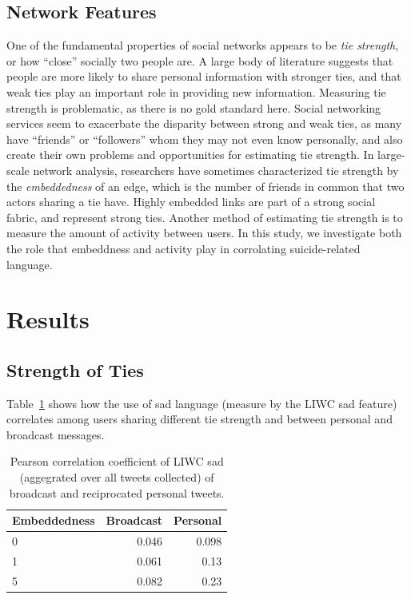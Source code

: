 \documentclass[11pt]{article}
\begin{document}
\subsection{Network Features}
One of the fundamental properties of social networks appears to be \emph{tie strength}, or how ``close'' socially two people are. A large body of literature suggests that people are more likely to share personal information with stronger ties, and that weak ties play an important role in providing new information.  
Measuring tie strength is problematic, as there is no gold standard here. Social networking services seem to exacerbate the disparity between strong and weak ties, as many have ``friends'' or ``followers'' whom they may not even know personally, and also create their own problems and opportunities for estimating tie strength. In large-scale network analysis, researchers have sometimes characterized tie strength by the 
\emph{embeddedness} of an edge, which is the number of friends in common that two actors sharing a tie have. Highly embedded links are part of a strong social fabric, and represent strong ties. Another method of estimating tie strength is to measure the amount of activity between users. In this study, we investigate both the role that embeddness and activity play in corrolating suicide-related language. 

\section{Results}
\subsection{Strength of Ties}
Table~\ref{tab:strength} shows how the use of sad language (measure by the LIWC sad feature) correlates among users sharing different tie strength and between personal and broadcast messages.

\begin{table}
  \centering
  \begin{tabular}{l|r|r}
Embeddedness    &Broadcast&Personal\\
\hline
0 & 0.046 & 0.098\\
\hline
1 & 0.061 & 0.13\\
\hline
5& 0.082 & 0.23
  \end{tabular}
\label{tab:strength}
\caption{Pearson correlation coefficient of LIWC sad (aggegrated over all tweets collected) of broadcast and reciprocated personal tweets.}
\end{table}
\end{document}

